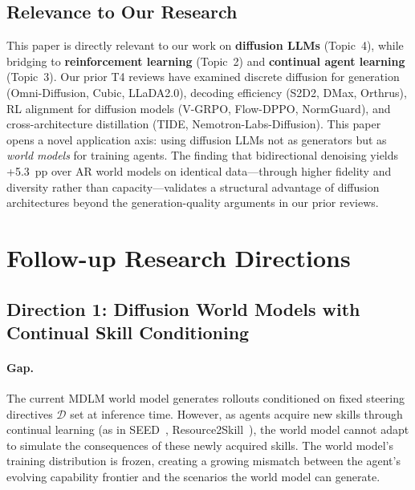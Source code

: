 \documentclass[11pt,a4paper]{article}
\begin{document}
\subsection{Relevance to Our Research}

This paper is directly relevant to our work on \textbf{diffusion LLMs} (Topic~4), while bridging to \textbf{reinforcement learning} (Topic~2) and \textbf{continual agent learning} (Topic~3). Our prior T4 reviews have examined discrete diffusion for generation (Omni-Diffusion, Cubic, LLaDA2.0), decoding efficiency (S2D2, DMax, Orthrus), RL alignment for diffusion models (V-GRPO, Flow-DPPO, NormGuard), and cross-architecture distillation (TIDE, Nemotron-Labs-Diffusion). This paper opens a novel application axis: using diffusion LLMs not as generators but as \emph{world models} for training agents. The finding that bidirectional denoising yields +5.3~pp over AR world models on identical data---through higher fidelity and diversity rather than capacity---validates a structural advantage of diffusion architectures beyond the generation-quality arguments in our prior reviews.

\section{Follow-up Research Directions}

\subsection{Direction 1: Diffusion World Models with Continual Skill Conditioning}

\paragraph{Gap.}
The current MDLM world model generates rollouts conditioned on fixed steering directives $\mathcal{D}$ set at inference time. However, as agents acquire new skills through continual learning (as in SEED~\cite{seed2026}, Resource2Skill~\cite{fan2026resource2skill}), the world model cannot adapt to simulate the consequences of these newly acquired skills. The world model's training distribution is frozen, creating a growing mismatch between the agent's evolving capability frontier and the scenarios the world model can generate.
\end{document}
